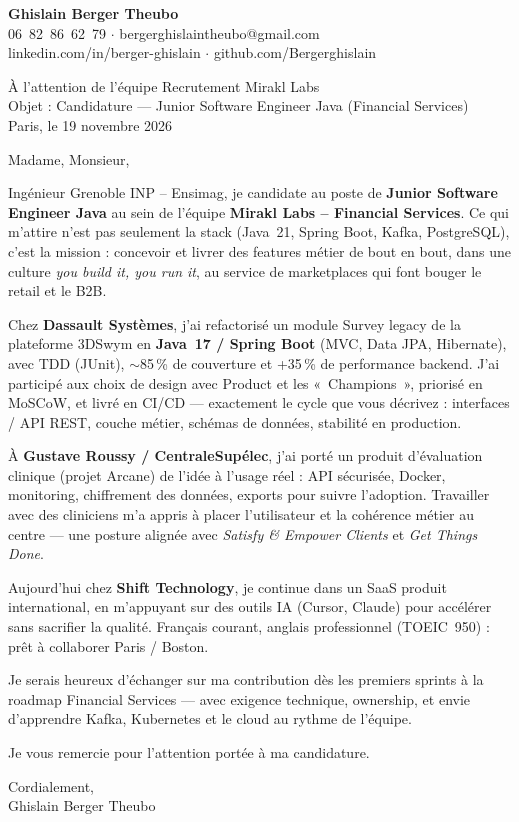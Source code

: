 \documentclass[11pt,a4paper]{article}
\begin{document}
{\large\bfseries Ghislain Berger Theubo}\\
06~82~86~62~79 $\cdot$ bergerghislaintheubo@gmail.com\\
linkedin.com/in/berger-ghislain $\cdot$ github.com/Bergerghislain

\vspace{1.2em}
\begin{flushright}
À l'attention de l'équipe Recrutement Mirakl Labs\\
Objet : Candidature --- Junior Software Engineer Java (Financial Services)\\
Paris, le 19 novembre 2026
\end{flushright}

Madame, Monsieur,

Ingénieur Grenoble INP -- Ensimag, je candidate au poste de \textbf{Junior Software Engineer Java}
au sein de l'équipe \textbf{Mirakl Labs -- Financial Services}. Ce qui m'attire n'est pas seulement
la stack (Java~21, Spring Boot, Kafka, PostgreSQL), c'est la mission : concevoir et livrer des
features métier de bout en bout, dans une culture \textit{you build it, you run it}, au service
de marketplaces qui font bouger le retail et le B2B.

Chez \textbf{Dassault Systèmes}, j'ai refactorisé un module Survey legacy de la plateforme 3DSwym
en \textbf{Java~17 / Spring Boot} (MVC, Data JPA, Hibernate), avec TDD (JUnit), $\sim$85\,\% de couverture
et +35\,\% de performance backend. J'ai participé aux choix de design avec Product et les
«~Champions~», priorisé en MoSCoW, et livré en CI/CD --- exactement le cycle que vous décrivez :
interfaces / API REST, couche métier, schémas de données, stabilité en production.

À \textbf{Gustave Roussy / CentraleSupélec}, j'ai porté un produit d'évaluation clinique (projet Arcane)
de l'idée à l'usage réel : API sécurisée, Docker, monitoring, chiffrement des données, exports pour
suivre l'adoption. Travailler avec des cliniciens m'a appris à placer l'utilisateur et la cohérence
métier au centre --- une posture alignée avec \textit{Satisfy \& Empower Clients} et
\textit{Get Things Done}.

Aujourd'hui chez \textbf{Shift Technology}, je continue dans un SaaS produit international, en
m'appuyant sur des outils IA (Cursor, Claude) pour accélérer sans sacrifier la qualité.
Français courant, anglais professionnel (TOEIC~950) : prêt à collaborer Paris / Boston.

Je serais heureux d'échanger sur ma contribution dès les premiers sprints à la roadmap
Financial Services --- avec exigence technique, ownership, et envie d'apprendre Kafka,
Kubernetes et le cloud au rythme de l'équipe.

Je vous remercie pour l'attention portée à ma candidature.

\vspace{1.2em}
Cordialement,\\[1.2em]
Ghislain Berger Theubo
\end{document}
